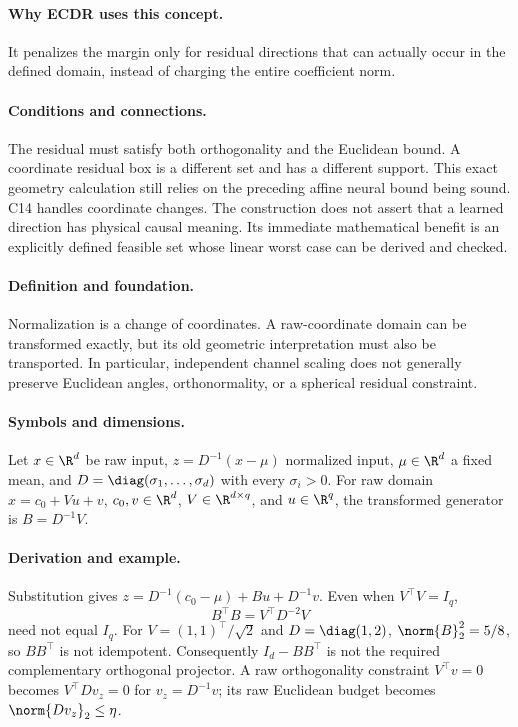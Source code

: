 \paragraph{Why ECDR uses this concept.}
It penalizes the margin only for residual directions that can actually occur in the defined domain, instead of charging the entire coefficient norm.
\paragraph{Conditions and connections.}
The residual must satisfy both orthogonality and the Euclidean bound. A coordinate residual box is a different set and has a different support. This exact geometry calculation still relies on the preceding affine neural bound being sound. C14 handles coordinate changes. The construction does not assert that a learned direction has physical causal meaning. Its immediate mathematical benefit is an explicitly defined feasible set whose linear worst case can be derived and checked.

\paragraph{Definition and foundation.}
Normalization is a change of coordinates. A raw-coordinate domain can be transformed exactly, but its old geometric interpretation must also be transported. In particular, independent channel scaling does not generally preserve Euclidean angles, orthonormality, or a spherical residual constraint.
\paragraph{Symbols and dimensions.}
Let $x\in\R^d$ be raw input, $z=D^{-1}(x-\mu)$ normalized input, $\mu\in\R^d$ a fixed mean, and $D=\diag(\sigma_1,\ldots,\sigma_d)$ with every $\sigma_i>0$. For raw domain $x=c_0+Vu+v$, $c_0,v\in\R^d$, $V\in\R^{d\times q}$, and $u\in\R^q$, the transformed generator is $B=D^{-1}V$.
\paragraph{Derivation and example.}
Substitution gives $z=D^{-1}(c_0-\mu)+Bu+D^{-1}v$. Even when $V^\top V=I_q$,
\[
 B^\top B=V^\top D^{-2}V
\]
need not equal $I_q$. For $V=(1,1)^\top/\sqrt2$ and $D=\diag(1,2)$, $\norm{B}_2^2=5/8$, so $BB^\top$ is not idempotent. Consequently $I_d-BB^\top$ is not the required complementary orthogonal projector.
A raw orthogonality constraint $V^\top v=0$ becomes $V^\top Dv_z=0$ for $v_z=D^{-1}v$; its raw Euclidean budget becomes $\norm{Dv_z}_2\le\eta$.
